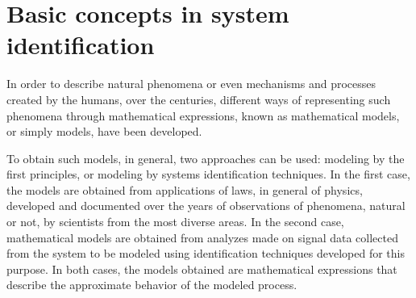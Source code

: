 
\chapter{Basic concepts in system identification}
\label{cap:cap2} \vspace{-1cm}

%
In order to describe natural phenomena or even mechanisms and processes created by the humans, over the centuries, different ways of representing such phenomena through mathematical expressions, known as mathematical models, or simply models, have been developed.

To obtain such models, in general, two approaches can be used: modeling by the first principles, or modeling by systems identification techniques. In the first case, the models are obtained from applications of laws, in general of physics, developed and documented over the years of observations of phenomena, natural or not, by scientists from the most diverse areas. In the second case, mathematical models are obtained from analyzes made on signal data collected from the system to be modeled using identification techniques developed for this purpose. In both cases, the models obtained are mathematical expressions that describe the approximate behavior of the modeled process.

